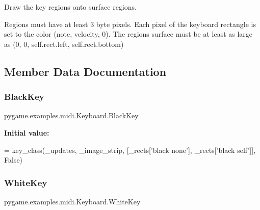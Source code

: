 \begin{DoxyVerb}Draw the key regions onto surface regions.

Regions must have at least 3 byte pixels. Each pixel of the keyboard
rectangle is set to the color (note, velocity, 0). The regions surface
must be at least as large as (0, 0, self.rect.left, self.rect.bottom)\end{DoxyVerb}
 

\subsection{Member Data Documentation}
\mbox{\label{classpygame_1_1examples_1_1midi_1_1_keyboard_af0b7f734cb2e1b101687ab0bf4139026}} 
\subsubsection{\texorpdfstring{Black\+Key}{BlackKey}}
{\footnotesize\ttfamily pygame.\+examples.\+midi.\+Keyboard.\+Black\+Key\hspace{0.3cm}{\ttfamily [static]}}

{\bfseries Initial value\+:}
\begin{DoxyCode}
=  key\_class(\_updates,
                         \_image\_strip,
                         [\_rects[\textcolor{stringliteral}{'black none'}], \_rects[\textcolor{stringliteral}{'black self'}]],
                         \textcolor{keyword}{False})
\end{DoxyCode}
\mbox{\label{classpygame_1_1examples_1_1midi_1_1_keyboard_ab3840ed930d23a7b94f5d58463274120}} 
\subsubsection{\texorpdfstring{White\+Key}{WhiteKey}}
{\footnotesize\ttfamily pygame.\+examples.\+midi.\+Keyboard.\+White\+Key\hspace{0.3cm}{\ttfamily [static]}}

